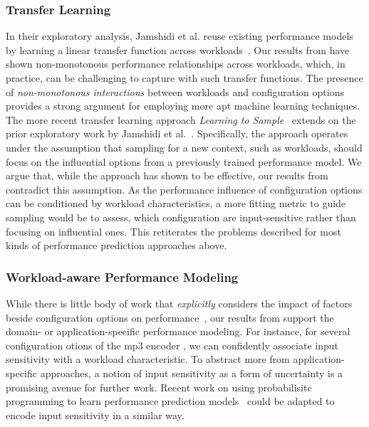 {{{\subsubsection{Transfer Learning} In their exploratory analysis, Jamshidi et al. reuse existing performance models by learning a linear transfer function across workloads~\cite{jamishidi_transfer_2017}. Our results from  have shown non-monotonous performance relationships across workloads, which, in practice, can be challenging to capture with such transfer functions. The presence of \textit{non-monotonous interactions} between workloads and configuration options provides a strong argument for employing more apt machine learning techniques. 
The more recent transfer learning approach \emph{Learning to Sample}~\cite{jamshidi_learning_2018} extends on the prior exploratory work by Jamshidi et al.~\cite{jamishidi_transfer_2017}. Specifically, the approach operates under the assumption that sampling for a new context, such as workloads, should focus on the influential options from a previously trained performance model. We argue that, while the approach has shown to be effective, our results from  contradict this assumption. As the performance influence of configuration options can be conditioned by workload characteristics, a more fitting metric to guide sampling would be to assess, which configuration are input-sensitive rather than focusing on influential ones. This retiterates the problems described for most kinds of performance prediction approaches above.

\subsubsection{Workload-aware Performance Modeling} While there is little body of work that \textit{explicitly} considers the impact of factors beside configuration options on performance~\cite{koc_satune_2021}, our results from  support the domain- or application-specific performance modeling. For instance, for several configuration otions of the mp3 encoder \jumper, we can confidently associate input sensitivity with a workload characteristic. To abstract more from application-specific approaches, a notion of input sensitivity as a form of uncertainty is a promising avenue for further work. Recent work on using probabilisitc programming to learn performance prediction models~\cite{dorn2020} could be adapted to encode input sensitivity in a similar way.


}}}
